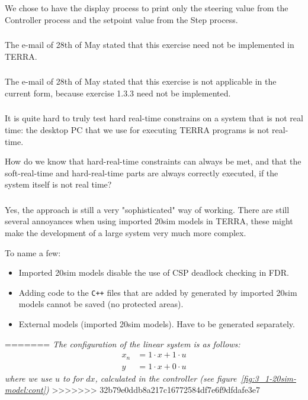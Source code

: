 \documentclass[a4paper,twoside,11pt]{article}
\newcommand{\cpp}{{\tt C++} }
\begin{document}
We chose to have the display process to print only the steering value from the Controller
process and the setpoint value from the Step process.

\subsubsection{}
The e-mail of 28th of May stated that this exercise need not be implemented in TERRA.
\subsubsection{}
The e-mail of 28th of May stated that this exercise is not applicable in the 
current form, because exercise 1.3.3 need not be implemented.

\subsubsection{}
It is quite hard to truly test hard real-time constrains on a system that is not 
real time: the desktop PC that we use for executing TERRA programs is not real-time.

How do we know that hard-real-time constraints can always be met, and that the
soft-real-time and hard-real-time parts are always correctly executed, if the system itself is not real time? 

\subsubsection{}
Yes, the approach is still a very "sophisticated" way of working.
There are still several annoyances when using imported 20sim models in TERRA,
these might make the development of a large system very much more complex.

To name a few:
\begin{itemize}
	\item Imported 20sim models disable the use of CSP deadlock checking in FDR.
	\item Adding code to the \cpp files that are added by generated by imported 20sim 
		models cannot be saved (no protected areas).
	\item External models (imported 20sim models). Have to be generated separately.
\end{itemize}

=======
\textit{The configuration of the linear system is as follows:
\begin{align}
 x_n &= 1\cdot x+1 \cdot u\nonumber\\
 y   &= 1\cdot x+0 \cdot u\nonumber
\end{align}
where we use $u$ to for $dx$, calculated in the controller (see figure~\ref{fig:3_1-20sim-model:cont})}
>>>>>>> 32b79e0ddb8a217c16772584df7e6f9dfdafe3e7
\end{document}
